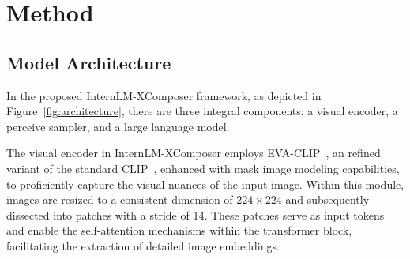 \documentclass[10pt,twocolumn,letterpaper]{article}
\begin{document}
\begin{table*}[t]
\centering
{}
\vspace{-5pt}
\caption {Datasets used for Supervised Fine-Tuning. }
\vspace{5pt}
\label{tab:sft data}
\end{table*}

\section{Method}

\subsection{Model Architecture}
In the proposed InternLM-XComposer framework, as depicted in Figure~\ref{fig:architecture}, there are three integral components: a visual encoder, a perceive sampler, and a large language model.

 The visual encoder in InternLM-XComposer employs EVA-CLIP~\cite{fang2023eva}, an refined variant of the standard CLIP~\cite{Yang2022ChineseCC}, enhanced with mask image modeling capabilities, to proficiently capture the visual nuances of the input image. Within this module, images are resized to a consistent dimension of $224\times 224$ and subsequently dissected into patches with a stride of 14. These patches serve as input tokens and enable the self-attention mechanisms within the transformer block, facilitating the extraction of detailed image embeddings.
\end{document}
